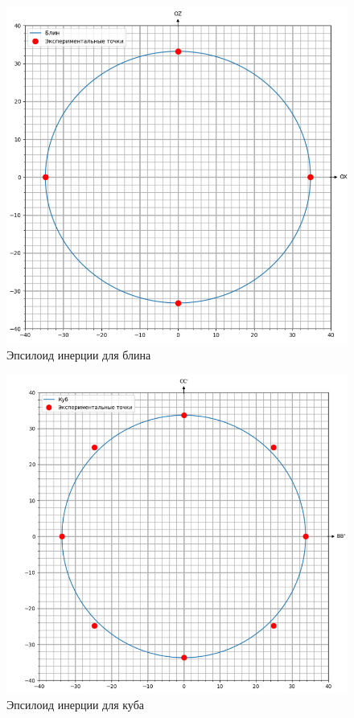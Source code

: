 \documentclass[a4paper, 10pt]{article}%
\begin{document}
\newpage
\begin{figure}[h]
                \centering
                \includegraphics[width=0.7\linewidth]{blin.png}
                \caption{Эпсилоид инерции для блина}
                \label{fig:mpr}
\end{figure}

\begin{figure}[h]
                \centering
                \includegraphics[width=0.7\linewidth]{kub.png}
                \caption{Эпсилоид инерции для куба}
                \label{fig:mpr}
\end{figure}
\clearpage
\end{document}
